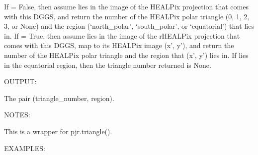 \documentclass[a4paper,12ptopenany,oneside,english]{sphinxmanual}
\begin{document}
\begin{fulllineitems}
\begin{fulllineitems}
\label{\detokenize{dggs:rhealpixdggs.dggs.RHEALPixDGGS.triangle}}
\pysigstartsignatures
{}
\pysigstopsignatures
\sphinxAtStartPar
If  = False, then assume  lies in the image of the
HEALPix projection that comes with this DGGS, and
return the number of the HEALPix polar triangle (0, 1, 2, 3, or None)
and the region (‘north\_polar’, ‘south\_polar’, or ‘equatorial’) that
 lies in.
If  = True, then assume  lies in the image of
the rHEALPix projection that comes with this DGGS, map 
to its HEALPix image (x’, y’), and return the number of the HEALPix
polar triangle and the region that (x’, y’) lies in.
If  lies in the equatorial region, then the triangle number
returned is None.

\sphinxAtStartPar
OUTPUT:

\sphinxAtStartPar
The pair (triangle\_number, region).

\sphinxAtStartPar
NOTES:

\sphinxAtStartPar
This is a wrapper for pjr.triangle().

\sphinxAtStartPar
EXAMPLES:

\begin{sphinxVerbatim}[commandchars=\\\{\}]
  
  \PYG{p}{[} \PYG{p}{]}
 

  \PYG{p}{[} \PYG{p}{]}
 


\end{sphinxVerbatim}
\end{fulllineitems}
\end{fulllineitems}
\end{document}
